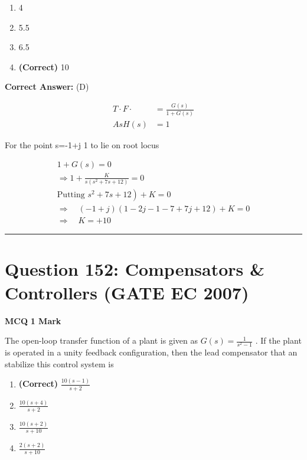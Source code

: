 \documentclass[11pt,a4paper]{article}
\begin{document}
\begin{enumerate}[label=(\Alph*)]
    \item 4
    \item 5.5
    \item 6.5
    \item \textbf{(Correct)} 10
\end{enumerate}

\noindent \textbf{Correct Answer:} (D)

\begin{tcolorbox}[solbox, title=Detailed Solution -- Question 151]
\[
\begin{aligned} T \cdot F \cdot &=\frac{G(s)}{1+G(s)} \\ A s H(s) &=1 \end{aligned}
\]

 For the point s=-1+j 1 to lie on root locus 

\[
\begin{array} {l} 1+G(s)=0 \\ \Rightarrow 1+\frac{K}{s\left(s^{2}+7 s+12\right)}=0 \\ \text{Putting }\left.s^{2}+7 s+12\right)+K=0 \\ \Rightarrow \quad(-1+j)(1-2 j-1-7+7 j+12)+K=0 \\ \Rightarrow \quad K=+10 \end{array}
\]
\end{tcolorbox}

\vspace{1.5em}
\hrule
\vspace{1.5em}

\section*{Question 152: Compensators \& Controllers (GATE EC 2007)}
\noindent \textbf{\color{primary}MCQ} \hfill \textbf{\color{secondary}1 Mark}


\noindent The open-loop transfer function of a plant is given as $G(s)=\frac{1}{s^{2}-1}$ . If the plant is operated in a unity feedback configuration, then the lead compensator that an stabilize this control system is


\begin{enumerate}[label=(\Alph*)]
    \item \textbf{(Correct)} $\frac{10(s-1)}{s+2}$
    \item $\frac{10(s+4)}{s+2}$
    \item $\frac{10(s+2)}{s+10}$
    \item $\frac{2(s+2)}{s+10}$
\end{enumerate}
\end{document}
